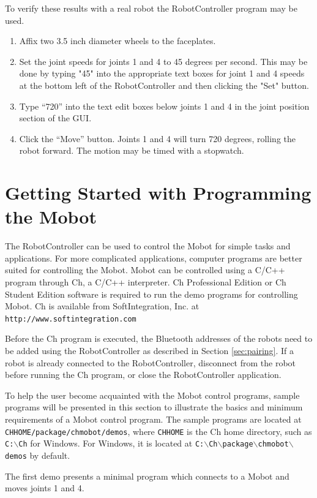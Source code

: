 \documentclass{article}
\begin{document}
To verify these results with a real robot the RobotController program may be used.
\begin{enumerate}
\item Affix two 3.5 inch diameter wheels to the faceplates.
\item Set the joint speeds for joints 1 and 4 to 45 degrees per second. This may
be done by typing "45" into the appropriate text boxes for joint 1 and 4 speeds at 
the bottom left of the RobotController and then clicking the "Set" button.
\item Type ``720'' into the text edit boxes below joints 1 and 4 in the joint
position section of the GUI.
\item Click the ``Move'' button. Joints 1 and 4 will turn 720 degrees, rolling
the robot forward. The motion may be timed with a stopwatch.
\end{enumerate}

\section{Getting Started with Programming the Mobot}
The RobotController can be used to control the Mobot for simple tasks and applications.
For more complicated applications, computer programs are better suited for controlling
the Mobot.
Mobot can be controlled using a C/C++ program through Ch, a C/C++ interpreter.
Ch Professional Edition or Ch Student Edition software is required to run the 
demo programs for controlling Mobot. Ch is available from SoftIntegration, Inc. at 
\texttt{http://www.softintegration.com}

Before the Ch program is executed, the Bluetooth addresses of the robots
need to be added using the RobotController as described in Section \ref{sec:pairing}.
If a robot is already connected to the RobotController, disconnect
from the robot before running the Ch program, or close the RobotController application.

To help the user become acquainted with the Mobot control programs, sample
programs will be presented in this section to illustrate the basics and minimum requirements of
a Mobot control program. The sample programs are located at 
\texttt{CHHOME/package/chmobot/demos}, where \texttt{CHHOME} is the 
Ch home directory, such as \texttt{C:$\backslash$Ch} for Windows. For Windows,
it is located at \texttt{C:$\backslash$Ch$\backslash$package$\backslash$chmobot$\backslash$demos} by default. 


The first demo presents a minimal program which connects to a Mobot and
moves joints 1 and 4.
\end{document}
